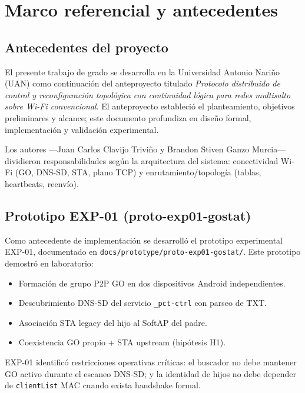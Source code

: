 \chapter{Marco referencial y antecedentes}
\label{cap:marco-referencial}

\section{Antecedentes del proyecto}
\label{sec:antecedentes}

El presente trabajo de grado se desarrolla en la Universidad Antonio Nariño (UAN) como continuación del anteproyecto titulado \emph{Protocolo distribuido de control y reconfiguración topológica con continuidad lógica para redes multisalto sobre Wi-Fi convencional}. El anteproyecto estableció el planteamiento, objetivos preliminares y alcance; este documento profundiza en diseño formal, implementación y validación experimental.

Los autores ---Juan Carlos Clavijo Triviño y Brandon Stiven Ganzo Murcia--- dividieron responsabilidades según la arquitectura del sistema: conectividad Wi-Fi (GO, DNS-SD, STA, plano TCP) y enrutamiento/topología (tablas, heartbeats, reenvío).

\section{Prototipo EXP-01 (proto-exp01-gostat)}
\label{sec:exp01}

Como antecedente de implementación se desarrolló el prototipo experimental EXP-01, documentado en \texttt{docs/prototype/proto-exp01-gostat/}. Este prototipo demostró en laboratorio:

\begin{itemize}
  \item Formación de grupo P2P GO en dos dispositivos Android independientes.
  \item Descubrimiento DNS-SD del servicio \texttt{\_pct-ctrl} con parseo de TXT.
  \item Asociación STA legacy del hijo al SoftAP del padre.
  \item Coexistencia GO propio + STA upstream (hipótesis H1).
\end{itemize}

EXP-01 identificó restricciones operativas críticas: el buscador no debe mantener GO activo durante el escaneo DNS-SD; y la identidad de hijos no debe depender de \texttt{clientList} MAC cuando exista handshake formal.

